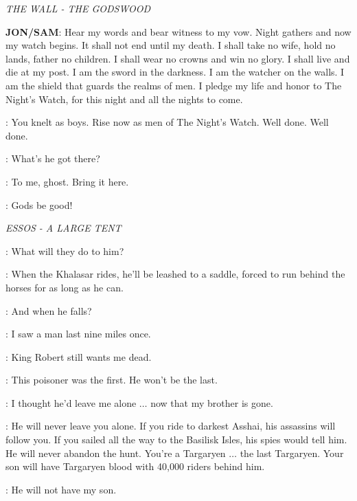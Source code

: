 \scene

\textit{THE WALL - THE GODSWOOD} 


\textbf{JON/SAM}: Hear my words and bear witness to my vow. Night gathers and now my watch begins. It shall not end until my death.  I shall take no wife, hold no lands, father no children. I shall wear no crowns and win no glory. I shall live and die at my post. I am the sword in the darkness. I am the watcher on the walls. I am the shield that guards the realms of men. I pledge my life and honor to The Night's Watch, for this night and all the nights to come. 

\WATCHMANc: You knelt as boys. Rise now as men of The Night's Watch. Well done. Well done. 


\SAM: What's he got there? 

\JON: To me, ghost. Bring it here. 


\SAM: Gods be good! 


\scene

\textit{ESSOS - A LARGE TENT} 


\DAENERYS: What will they do to him? 

\JORAH: When the Khalasar rides, he'll be leashed to a saddle, forced to run behind the horses for as long as he can. 

\DAENERYS: And when he falls? 

\JORAH: I saw a man last nine miles once. 

\DAENERYS: King Robert still wants me dead. 

\JORAH: This poisoner was the first. He won't be the last. 

\DAENERYS: I thought he'd leave me alone $\ldots$ now that my brother is gone. 

\JORAH: He will never leave you alone. If you ride to darkest Asshai, his assassins will follow you. If you sailed all the way to the Basilisk Isles, his spies would tell him. He will never abandon the hunt. You're a Targaryen $\ldots$  the last Targaryen. Your son will have Targaryen blood with 40,000 riders behind him. 

\DAENERYS: He will not have my son. 


